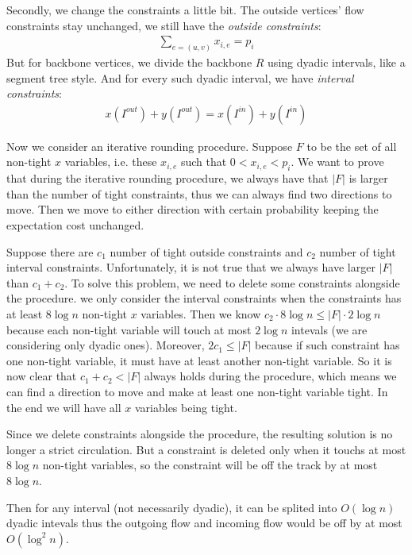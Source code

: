 \documentclass[11pt]{article}
\newcommand{\1}{\mathbf{1}}
\begin{document}
Secondly, we change the constraints a little bit. The outside vertices' flow constraints
stay unchanged, we still have the \emph{outside constraints}:
\begin{align*}
    \sum_{e = (u,v)} x_{i,e} = p_i 
\end{align*}
But for backbone vertices, we divide the backbone $R$ using dyadic intervals, like 
a segment tree style. And for every such dyadic interval, we have \emph{interval constraints}:
\begin{align*}
    x(I^{out}) + y(I^{out}) = x(I^{in}) + y(I^{in})
\end{align*}

Now we consider an iterative rounding procedure. Suppose $F$ to be the set of all 
non-tight $x$ variables, i.e. these $x_{i,e}$ such that $0 < x_{i,e} < p_i$.
We want to prove that during the iterative rounding procedure, we always have that 
$|F|$ is larger than the number of tight constraints, thus we can always find two 
directions to move. Then we move to either direction with certain probability 
keeping the expectation cost unchanged.

Suppose there are $c_1$ number of tight outside constraints and $c_2$ number of
tight interval constraints. 
Unfortunately, it is not true that we always have larger $|F|$ than 
$c_1 + c_2$.
To solve this problem, we need to delete some constraints alongside the procedure.
we only consider the interval constraints when the constraints has at least 
$8 \log n$ non-tight $x$ variables. 
Then we know $c_2 \cdot 8 \log n \le |F| \cdot 2 \log n$ because each non-tight
variable will touch at most $2 \log n$ intevals (we are considering only dyadic ones).
Moreover, $2 c_1 \le |F|$ because if such constraint has one non-tight variable,
it must have at least another non-tight variable.
So it is now clear that $c_1 + c_2 < |F|$ always holds during the procedure, 
which means we can find a direction to move and make at least one non-tight 
variable tight. In the end we will have all $x$ variables being tight.

Since we delete constraints alongside the procedure, the resulting solution is 
no longer a strict circulation. But a constraint is deleted only when it touchs 
at most $8 \log n$ non-tight variables, so the constraint will be off the track
by at most $8 \log n$.

Then for any interval (not necessarily dyadic), it can be splited into $O(\log n)$
dyadic intevals thus the outgoing flow and incoming flow would be off by at most 
$O(\log ^2 n)$.
 
\end{document}
